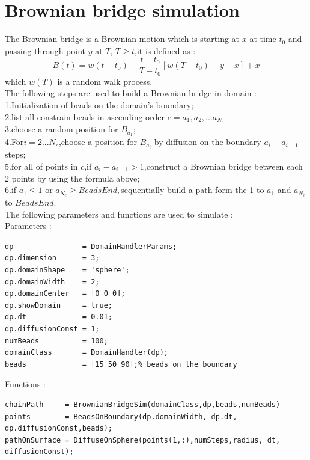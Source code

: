 \documentclass{article}
\begin{document}
\section{Brownian bridge simulation}
The Brownian bridge is a Brownian motion which is starting at $x$ at time $t_0$ and passing through point $y$ at $T$, $T \geq t$,it is defined as :\\
\begin{equation}
B(t) = w(t-t_0)-\frac{t-t_0}{T-t_0}[w(T-t_0)-y+x]+x
\end{equation}
which $w(T)$ is a random walk process.\\
The following steps are used to build a Brownian bridge in domain :\\

1.Initialization of beads on the domain's boundary;\\

2.list all constrain beads in ascending order $c={a_1,a_2,...a_{N_c}}$\\

3.choose a random position for $B_{a_1}$;\\

4.For$i =2...N_c$,choose a position for $B_{a_i}$ by diffusion on the boundary $a_i -a_{i-1}$ steps;\\

5.for all of points in $c$,if $a_{i}-a_{i-1}>1$,construct a Brownian bridge between each 2 points by using the formula above;\\

6.if $a_1 \leq 1$ or $a_{N_c} \geq BeadsEnd,$sequentially build a path form the 1 to $a_1$ and $a_{N_c}$ to $BeadsEnd$.\\

The following parameters and functions are used to simulate :\\

Parameters :
\begin{lstlisting}
dp                = DomainHandlerParams;
dp.dimension      = 3;
dp.domainShape    = 'sphere';
dp.domainWidth    = 2;
dp.domainCenter   = [0 0 0];
dp.showDomain     = true;
dp.dt             = 0.01;
dp.diffusionConst = 1;
numBeads          = 100;
domainClass       = DomainHandler(dp);
beads             = [15 50 90];% beads on the boundary
\end{lstlisting}

Functions :
\begin{lstlisting}
chainPath     = BrownianBridgeSim(domainClass,dp,beads,numBeads)
points        = BeadsOnBoundary(dp.domainWidth, dp.dt, dp.diffusionConst,beads);
pathOnSurface = DiffuseOnSphere(points(1,:),numSteps,radius, dt, diffusionConst);
\end{lstlisting}
\end{document}
